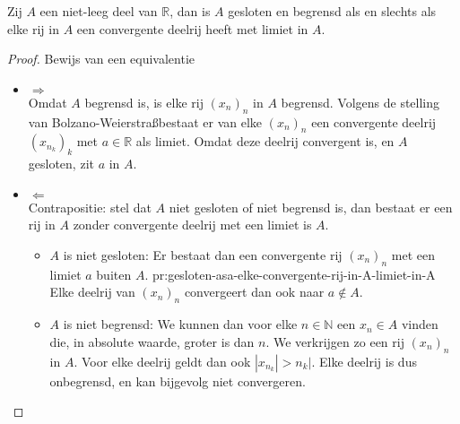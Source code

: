 \documentclass[main.tex]{subfiles}
\begin{document}
\begin{pr}
  Zij $A$ een niet-leeg deel van $\mathbb{R}$, dan is $A$ gesloten en begrensd als en slechts als elke rij in $A$ een convergente deelrij heeft met limiet in $A$.

  \begin{proof}
    Bewijs van een equivalentie\\
    \begin{itemize}
    \item $\Rightarrow$\\
      Omdat $A$ begrensd is, is elke rij $(x_{n})_{n}$ in $A$ begrensd.
      Volgens de stelling van Bolzano-Weierstra\ss bestaat er van elke $(x_{n})_{n}$ een convergente deelrij $(x_{n_{k}})_{k}$ met $a \in \mathbb{R}$ als limiet.
      Omdat deze deelrij convergent is, en $A$ gesloten, zit $a$ in $A$.
      
    \item $\Leftarrow$\\
      Contrapositie: stel dat $A$ niet gesloten of niet begrensd is, dan bestaat er een rij in $A$ zonder convergente deelrij met een limiet is $A$.
      \begin{itemize}
      \item $A$ is niet gesloten:
        Er bestaat dan een convergente rij $(x_{n})_{n}$ met een limiet $a$ buiten $A$. {pr:gesloten-asa-elke-convergente-rij-in-A-limiet-in-A}
        Elke deelrij van $(x_{n})_{n}$ convergeert dan ook naar $a\not\in A$.
      \item $A$ is niet begrensd:
        We kunnen dan voor elke $n\in \mathbb{N}$ een $x_{n}\in A$ vinden die, in absolute waarde, groter is dan $n$.
        We verkrijgen zo een rij $(x_{n})_{n}$ in $A$.
        Voor elke deelrij geldt dan ook $|x_{n_{k}}| > n_{k}|$.
        Elke deelrij is dus onbegrensd, en kan bijgevolg niet convergeren.
      \end{itemize}
    \end{itemize}
  \end{proof}
\end{pr}
\end{document}
